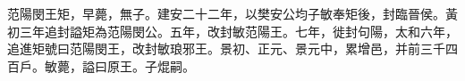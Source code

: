 \begin{pinyinscope}
 
 
 范陽閔王矩，早薨，無子。建安二十二年，以樊安公均子敏奉矩後，封臨晉侯。黃初三年追封謚矩為范陽閔公。五年，改封敏范陽王。七年，徙封句陽，太和六年，追進矩號曰范陽閔王，改封敏琅邪王。景初、正元、景元中，累增邑，并前三千四百戶。敏薨，謚曰原王。子焜嗣。
 
 
\end{pinyinscope}